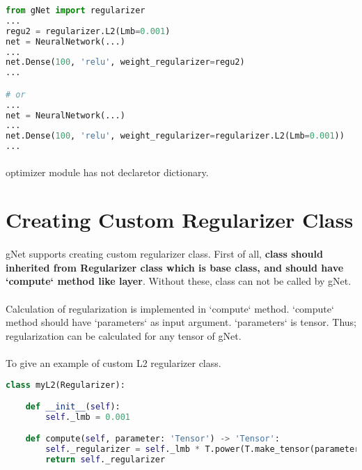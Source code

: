 \documentclass[12pt]{report}
\begin{document}
\begin{lstlisting}[language=Python, numbers=none, caption={Built-in L2 regularizer with custom parameters.}, label={lis:regularizer-built-in-custom-params}]
from gNet import regularizer
...
regu2 = regularizer.L2(Lmb=0.001)
net = NeuralNetwork(...)
...
net.Dense(100, 'relu', weight_regularizer=regu2)
...

# or 
...
net = NeuralNetwork(...)
...
net.Dense(100, 'relu', weight_regularizer=regularizer.L2(Lmb=0.001))
...
\end{lstlisting}

\paragraph{}
optimizer module has not declaretor dictionary. 

\section{Creating Custom Regularizer Class}

\paragraph{}
gNet supports creating custom regularizer class. First of all, \textbf{class should inherited from Regularizer class which is base class, and should have `compute` method like layer}. Without these, class can not be called by gNet. 

\paragraph{}
Calculation of regularization is implemented in `compute` method. `compute` method should have `parameters` as input argument. `parameters` is tensor. Thus; regularization can be calculated for any tensor of gNet.

\paragraph{}
To give an example of custom L2 regularizer class.


\begin{lstlisting}[language=Python, numbers=none, caption={Custom regularizer class.}, label={lis:regularizer-custom-class}]
class myL2(Regularizer):

	def __init__(self):
		self._lmb = 0.001

	def compute(self, parameter: 'Tensor') -> 'Tensor':
		self._regularizer = self._lmb * T.power(T.make_tensor(parameter), 2).sum()
		return self._regularizer
\end{lstlisting}
\end{document}
